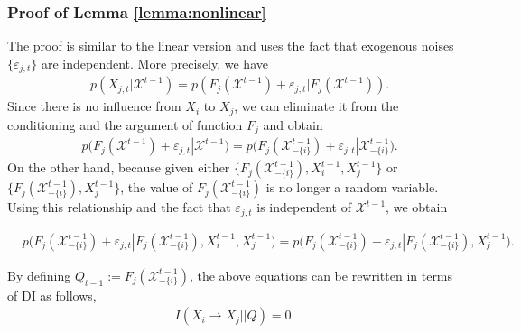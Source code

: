 \subsubsection{Proof of Lemma \ref{lemma:nonlinear}}
The proof is similar to the linear version and uses the fact that exogenous noises $\{\varepsilon_{j,t}\}$ are independent. More precisely, we have  
\begin{align*}
    &p(X_{j,t}|\mathcal{X}^{t-1})=p(F_{j}(\mathcal{X}^{t-1}) + \varepsilon_{j,t}|F_{j}(\mathcal{X}^{t-1})).
\end{align*}
Since there is no influence from $X_i$ to $X_j$, we can eliminate it from the conditioning and the argument of function $F_j$ and obtain
\begin{align*}
&p\big(F_{j}(\mathcal{X}^{t-1}) + \varepsilon_{j,t}|\mathcal{X}^{t-1}\big)=p\big(F_{j}(\mathcal{X}_{-\{i\}}^{t-1}) + \varepsilon_{j,t}|\mathcal{X}_{-\{i\}}^{t-1}\big).
\end{align*}
On the other hand, because given either $\{F_{j}(\mathcal{X}_{-\{i\}}^{t-1}), X_i^{t-1},X_j^{t-1}\}$ or \\
$\{F_{j}(\mathcal{X}_{-\{i\}}^{t-1}),X_j^{t-1}\}$, the value of $F_{j}(\mathcal{X}_{-\{i\}}^{t-1})$ is no longer a random variable. Using this relationship and the fact that $\varepsilon_{j,t}$ is independent of $\mathcal{X}^{t-1}$, we obtain
\begin{small}
\begin{align*}
    &p\big(F_{j}(\mathcal{X}_{-\{i\}}^{t-1}) + \varepsilon_{j,t}|F_{j}(\mathcal{X}_{-\{i\}}^{t-1}), X_i^{t-1},X_j^{t-1}\big)=
    p\big(F_{j}(\mathcal{X}_{-\{i\}}^{t-1}) + \varepsilon_{j,t}|F_{j}(\mathcal{X}_{-\{i\}}^{t-1}), X_j^{t-1}\big).
\end{align*}
\end{small}
By defining $Q_{t-1}:=F_{j}(\mathcal{X}_{-\{i\}}^{t-1})$, the above equations can be rewritten in terms of DI as follows,
\begin{align*}
    I(X_i\rightarrow X_j||Q)=0.
\end{align*}

